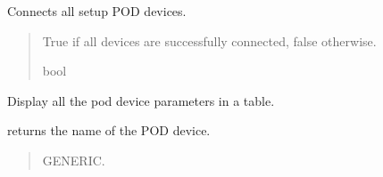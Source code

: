 \documentclass[letterpaper,10pt,english]{sphinxmanual}
\begin{document}
\begin{fulllineitems}
\begin{fulllineitems}
\end{fulllineitems}


\begin{fulllineitems}
\label{\detokenize{Setup_PodInterface:Setup_PodInterface.Setup_Interface.ConnectAllPODdevices}}
\pysigstartsignatures
{}
\pysigstopsignatures
\sphinxAtStartPar
Connects all setup POD devices.
\begin{quote}\begin{description}
\sphinxAtStartPar
True if all devices are successfully connected, false otherwise.

\sphinxAtStartPar
bool

\end{description}\end{quote}

\end{fulllineitems}


\begin{fulllineitems}
\label{\detokenize{Setup_PodInterface:Setup_PodInterface.Setup_Interface.DisplayPODdeviceParameters}}
\pysigstartsignatures
{}
\pysigstopsignatures
\sphinxAtStartPar
Display all the pod device parameters in a table.

\end{fulllineitems}


\begin{fulllineitems}
\label{\detokenize{Setup_PodInterface:Setup_PodInterface.Setup_Interface.GetDeviceName}}
\pysigstartsignatures
{}
\pysigstopsignatures
\sphinxAtStartPar
returns the name of the POD device.
\begin{quote}\begin{description}
\sphinxAtStartPar
GENERIC.


\end{description}
\end{quote}
\end{fulllineitems}
\end{fulllineitems}
\end{document}
